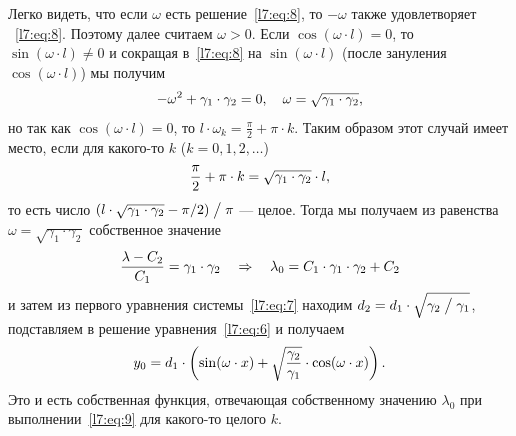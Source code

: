 Легко видеть, что если $\omega$ есть решение~\eqref{l7:eq:8}, то $-\omega$ также удовлетворяет ~\eqref{l7:eq:8}. Поэтому далее считаем $\omega>0$. Если $\cos(\omega\cdot l)=0$, то $\sin(\omega\cdot l)\neq0$ и сокращая в~\eqref{l7:eq:8} на $\sin(\omega\cdot l)$ (после зануления $\cos(\omega\cdot l)$) мы получим 
\begin{equation*}
	\hfill-\omega^2+\gamma_1\cdot\gamma_2=0,\quad\omega=\sqrt{\gamma_1\cdot\gamma_2},\hfill
\end{equation*}
но так как $\cos(\omega\cdot l)=0$, то $l\cdot\omega_k=\displaystyle\frac{\pi}{2}+\pi\cdot k$. Таким образом этот случай имеет место, если для какого-то $k$ ($k=0,1,2,\ldots$)
\begin{equation}
	\label{l7:eq:9}
	\hfill\frac{\pi}{2}+\pi\cdot k=\sqrt{\gamma_1\cdot\gamma_2}\cdot l,\hfill
\end{equation} 
то есть число $(l\cdot\sqrt{\gamma_1\cdot\gamma_2}-\pi/2)\bigm/\pi$ --- целое.  Тогда мы получаем из равенства $\omega=\sqrt{\gamma_1\cdot\gamma_2}$ собственное значение 
\begin{equation*}
	\hfill\frac{\lambda-C_2}{C_1}=\gamma_1\cdot\gamma_2\quad\Rightarrow\quad\lambda_0=C_1\cdot\gamma_1\cdot\gamma_2+C_2\hfill
\end{equation*}
и затем из первого уравнения системы~\eqref{l7:eq:7} находим $d_2=d_1\cdot\sqrt{\gamma_2\bigm/\gamma_1}$, подставляем в решение уравнения~\eqref{l7:eq:6} и получаем 
\begin{equation*}
	\hfill y_0=d_1\cdot\left(\sin(\omega\cdot x)+\sqrt{\frac{\gamma_2}{\gamma_1}}\cdot\cos(\omega\cdot x)\right).\hfill
\end{equation*}
Это и есть собственная функция, отвечающая собственному значению $\lambda_0$ при выполнении~\eqref{l7:eq:9} для какого-то целого $k$. 

